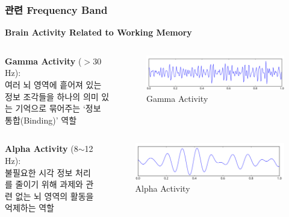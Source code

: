 \documentclass{beamer}
\begin{document}
\subsubsection{관련 Frequency Band}
\begin{frame}{\textbf{Brain Activity Related to Working Memory}}
  \begin{columns}
    \begin{column}{0.52\textwidth}
      \large
      \textbf{Gamma Activity} ($>$30 Hz):\\여러 뇌 영역에 흩어져 있는 정보 조각들을 하나의 의미 있는 기억으로 묶어주는 `정보 통합(Binding)' 역할
    \end{column}
    \hfill
    \begin{column}{0.48\textwidth}
      \centering
      \begin{figure}
        \centering
        \includegraphics[width=\textwidth]{image/gamma}
        \caption{Gamma Activity}
      \end{figure}
    \end{column}
  \end{columns}
  \begin{columns}
    \begin{column}{0.52\textwidth}
      \large
      \textbf{Alpha Activity} (8$\sim$12 Hz):\\불필요한 시각 정보 처리를 줄이기 위해 과제와 관련 없는 뇌 영역의 활동을 억제하는 역할
    \end{column}
    \hfill
    \begin{column}{0.48\textwidth}
      \centering
      \begin{figure}
        \centering
        \includegraphics[width=\textwidth]{image/alpha}
        \caption{Alpha Activity}
      \end{figure}
    \end{column}
  \end{columns}
\end{frame}
\end{document}
